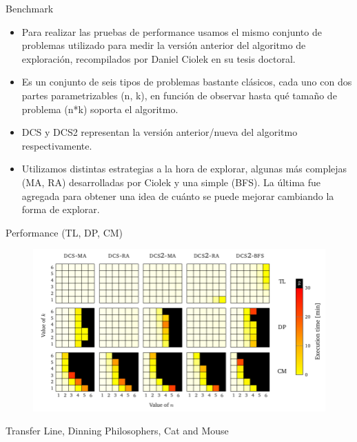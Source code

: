 \begin{frame}{Benchmark}
    \begin{itemize}
     \item Para realizar las pruebas de performance usamos el mismo conjunto de problemas utilizado para medir la versión anterior del algoritmo de exploración, recompilados por Daniel Ciolek en su tesis doctoral.
     
     \item Es un conjunto de seis tipos de problemas bastante clásicos, cada uno con dos partes parametrizables (n, k), en función de observar hasta qué tamaño de problema (n*k) soporta el algoritmo.
     
     \item DCS y DCS2 representan la versión anterior/nueva del algoritmo respectivamente.
     
     \item Utilizamos distintas estrategias a la hora de explorar, algunas más complejas (MA, RA) desarrolladas por Ciolek y una simple (BFS). La última fue agregada para obtener una idea de cuánto se puede mejorar cambiando la forma de explorar.
    \end{itemize}

\end{frame}
\begin{frame}{Performance (TL, DP, CM)}
    \begin{figure}
        \includegraphics[width=\textwidth]{figures/benchmark1.png}
    \end{figure}

    Transfer Line, Dinning Philosophers, Cat and Mouse
    
\end{frame}
